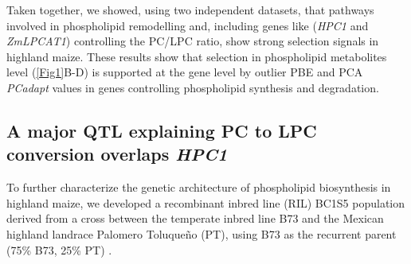 \documentclass[9pt,twocolumn,twoside,lineno]{biorxiv}
\newcommand{\hpc}{\textit{HPC1}\xspace}
\begin{document}
Taken together, we showed, using two independent datasets, that pathways involved in phospholipid remodelling and, including genes like (\hpc and \textit{ZmLPCAT1}) controlling the PC/LPC ratio, show strong selection signals in highland maize. 
These results show that selection in phospholipid metabolites level (\cref{Fig1}B-D) is supported at the gene level by outlier PBE and PCA \textit{PCadapt} values in genes controlling phospholipid synthesis and degradation.

\subsection{A major QTL explaining PC to LPC conversion overlaps \hpc}
To further characterize the genetic architecture of phospholipid biosynthesis in highland maize, we developed a recombinant inbred line (RIL) BC1S5 population derived from a cross between the temperate inbred line B73 and the Mexican highland landrace Palomero Toluqueño (PT), using B73 as the recurrent parent (75\% B73, 25\% PT) \cite{Perez-Limon2022-lg}.
\end{document}
